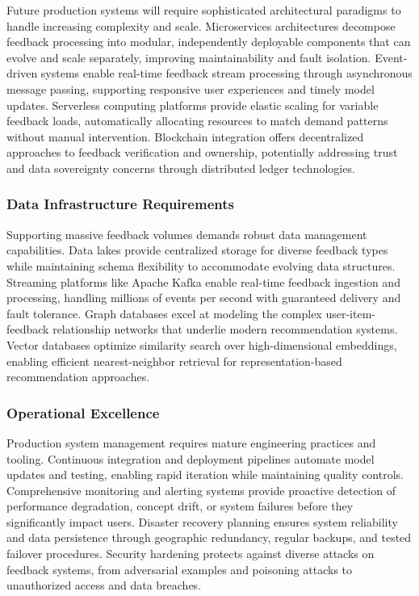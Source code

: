Future production systems will require sophisticated architectural paradigms to handle increasing complexity and scale. Microservices architectures decompose feedback processing into modular, independently deployable components that can evolve and scale separately, improving maintainability and fault isolation. Event-driven systems enable real-time feedback stream processing through asynchronous message passing, supporting responsive user experiences and timely model updates. Serverless computing platforms provide elastic scaling for variable feedback loads, automatically allocating resources to match demand patterns without manual intervention. Blockchain integration offers decentralized approaches to feedback verification and ownership, potentially addressing trust and data sovereignty concerns through distributed ledger technologies.

\subsubsection{Data Infrastructure Requirements}

Supporting massive feedback volumes demands robust data management capabilities. Data lakes provide centralized storage for diverse feedback types while maintaining schema flexibility to accommodate evolving data structures. Streaming platforms like Apache Kafka enable real-time feedback ingestion and processing, handling millions of events per second with guaranteed delivery and fault tolerance. Graph databases excel at modeling the complex user-item-feedback relationship networks that underlie modern recommendation systems. Vector databases optimize similarity search over high-dimensional embeddings, enabling efficient nearest-neighbor retrieval for representation-based recommendation approaches.

\subsubsection{Operational Excellence}

Production system management requires mature engineering practices and tooling. Continuous integration and deployment pipelines automate model updates and testing, enabling rapid iteration while maintaining quality controls. Comprehensive monitoring and alerting systems provide proactive detection of performance degradation, concept drift, or system failures before they significantly impact users. Disaster recovery planning ensures system reliability and data persistence through geographic redundancy, regular backups, and tested failover procedures. Security hardening protects against diverse attacks on feedback systems, from adversarial examples and poisoning attacks to unauthorized access and data breaches.

